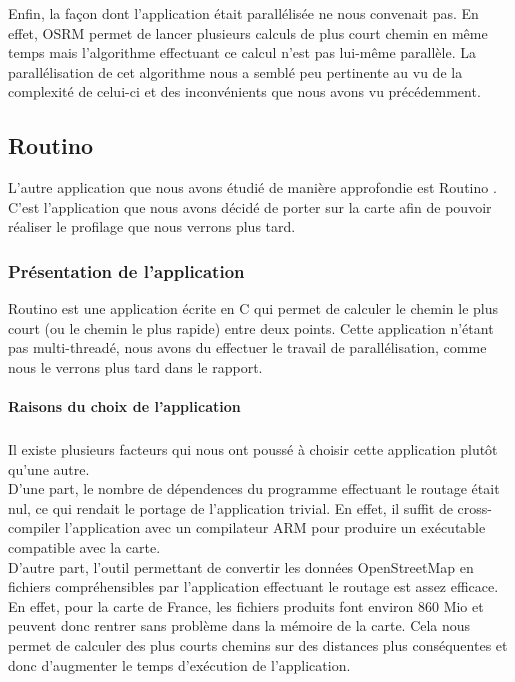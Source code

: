 Enfin, la façon dont l'application était parallélisée ne nous convenait pas. En 
effet, OSRM permet de lancer plusieurs calculs de plus court chemin en même 
temps mais l'algorithme effectuant ce calcul n'est pas lui-même parallèle. 
La parallélisation de cet algorithme nous a semblé peu pertinente au vu de la 
complexité de celui-ci et des inconvénients que nous avons vu précédemment.

\subsection{Routino}

L'autre application que nous avons étudié de manière approfondie est Routino 
\cite{bishop_routino_????}. C'est l'application que nous avons décidé de
porter sur la carte afin de pouvoir réaliser le profilage que nous verrons plus
tard.

\subsubsection{Présentation de l'application}

Routino est une application écrite en C qui permet de calculer le chemin le 
plus court (ou le chemin le plus rapide) entre deux points. Cette application 
n'étant pas multi-threadé, nous avons du effectuer le travail de parallélisation,
comme nous le verrons plus tard dans le rapport.

\paragraph{Raisons du choix de l'application}
\subparagraph{}

Il existe plusieurs facteurs qui nous ont poussé à choisir cette application 
plutôt qu'une autre. \\

D'une part, le nombre de dépendences du programme effectuant le routage 
était nul, ce qui rendait le portage de l'application trivial. En effet, il 
suffit de cross-compiler l'application avec un compilateur ARM pour produire
un exécutable compatible avec la carte. \\

D'autre part, l'outil permettant de convertir les données OpenStreetMap en 
fichiers compréhensibles par l'application effectuant le routage est assez 
efficace. En effet, pour la carte de France, les fichiers produits font environ 
860 Mio et peuvent donc rentrer sans problème dans la mémoire de la carte. Cela 
nous permet de calculer des plus courts chemins sur des distances plus 
conséquentes et donc d'augmenter le temps d'exécution de l'application. \\

